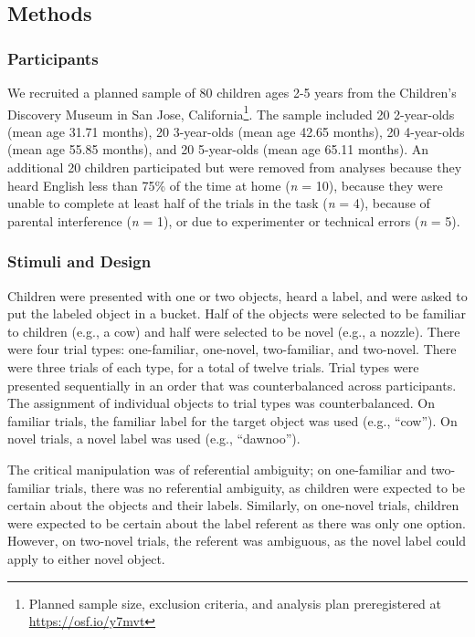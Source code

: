 \documentclass[10pt, letterpaper]{article}
\begin{document}
\subsection{Methods}\label{methods}

\subsubsection{Participants}\label{participants}

We recruited a planned sample of 80 children ages 2-5 years from the
Children's Discovery Museum in San Jose, California\footnote{Planned
  sample size, exclusion criteria, and analysis plan preregistered at
  \url{https://osf.io/y7mvt}}. The sample included 20 2-year-olds (mean
age 31.71 months), 20 3-year-olds (mean age 42.65 months), 20
4-year-olds (mean age 55.85 months), and 20 5-year-olds (mean age 65.11
months). An additional 20 children participated but were removed from
analyses because they heard English less than 75\% of the time at home
(\emph{n} = 10), because they were unable to complete at least half of
the trials in the task (\emph{n} = 4), because of parental interference
(\emph{n} = 1), or due to experimenter or technical errors (\emph{n} =
5).

\subsubsection{Stimuli and Design}\label{stimuli-and-design}

Children were presented with one or two objects, heard a label, and were
asked to put the labeled object in a bucket. Half of the objects were
selected to be familiar to children (e.g., a cow) and half were selected
to be novel (e.g., a nozzle). There were four trial types: one-familiar,
one-novel, two-familiar, and two-novel. There were three trials of each
type, for a total of twelve trials. Trial types were presented
sequentially in an order that was counterbalanced across participants.
The assignment of individual objects to trial types was counterbalanced.
On familiar trials, the familiar label for the target object was used
(e.g., ``cow''). On novel trials, a novel label was used (e.g.,
``dawnoo'').

The critical manipulation was of referential ambiguity; on one-familiar
and two-familiar trials, there was no referential ambiguity, as children
were expected to be certain about the objects and their labels.
Similarly, on one-novel trials, children were expected to be certain
about the label referent as there was only one option. However, on
two-novel trials, the referent was ambiguous, as the novel label could
apply to either novel object.
\end{document}
